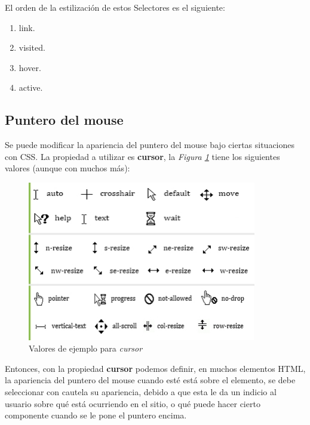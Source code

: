 El orden de la estilización de estos Selectores es el siguiente:
\begin{enumerate}
    \item link.
    \item visited.
    \item hover.
    \item active.
\end{enumerate}


\subsection{Puntero del mouse}

Se puede modificar la apariencia del puntero del mouse bajo ciertas situaciones con CSS. La propiedad a utilizar es \textbf{cursor}, la \textit{Figura \ref{fig: 24}} tiene los siguientes valores (aunque con muchos más):
\begin{figure}[H]
    \centering
    \caption{Valores de ejemplo para \textit{cursor}}
    \label{fig: 24}
    \includegraphics[width=10cm]{ss/cursor.png}
\end{figure}

Entonces, con la propiedad \textbf{cursor} podemos definir, en muchos elementos HTML, la apariencia del puntero del mouse cuando esté está sobre el elemento, se debe seleccionar con cautela su apariencia, debido a que esta le da un indicio al usuario sobre qué está ocurriendo en el sitio, o qué puede hacer cierto componente cuando se le pone el puntero encima.
